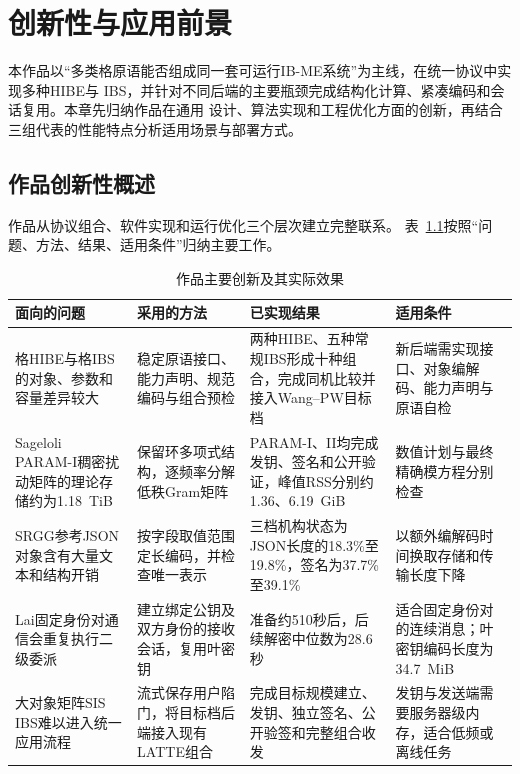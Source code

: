 \chapter{创新性与应用前景}

本作品以“多类格原语能否组成同一套可运行IB-ME系统”为主线，在统一协议中实现多种HIBE与
IBS，并针对不同后端的主要瓶颈完成结构化计算、紧凑编码和会话复用。本章先归纳作品在通用
设计、算法实现和工程优化方面的创新，再结合三组代表的性能特点分析适用场景与部署方式。

\section{作品创新性概述}

作品从协议组合、软件实现和运行优化三个层次建立完整联系。
表~\ref{tab:innovation-summary}按照“问题、方法、结果、适用条件”归纳主要工作。

\begin{table}[H]
\centering\small
\caption{作品主要创新及其实际效果}
\label{tab:innovation-summary}
\begin{tabularx}{\textwidth}{@{}>{\raggedright\arraybackslash}p{}>{\raggedright\arraybackslash}p{}>{\raggedright\arraybackslash}p{}>{\raggedright\arraybackslash}X@{}}
\toprule
\rowcolor{black!8} 面向的问题 & 采用的方法 & 已实现结果 & 适用条件 \\
\midrule
格HIBE与格IBS的对象、参数和容量差异较大
& 稳定原语接口、能力声明、规范编码与组合预检
& 两种HIBE、五种常规IBS形成十种组合，完成同机比较并接入Wang--PW目标档
& 新后端需实现接口、对象编解码、能力声明与原语自检 \\

Sageloli PARAM-I稠密扰动矩阵的理论存储约为1.18~TiB
& 保留环多项式结构，逐频率分解低秩Gram矩阵
& PARAM-I、II均完成发钥、签名和公开验证，峰值RSS分别约1.36、6.19~GiB
& 数值计划与最终精确模方程分别检查 \\

SRGG参考JSON对象含有大量文本和结构开销
& 按字段取值范围定长编码，并检查唯一表示
& 三档机构状态为JSON长度的18.3\%至19.8\%，签名为37.7\%至39.1\%
& 以额外编解码时间换取存储和传输长度下降 \\

Lai固定身份对通信会重复执行二级委派
& 建立绑定公钥及双方身份的接收会话，复用叶密钥
& 准备约510秒后，后续解密中位数为28.6秒
& 适合固定身份对的连续消息；叶密钥编码长度为34.7~MiB \\

大对象矩阵SIS IBS难以进入统一应用流程
& 流式保存用户陷门，将目标档后端接入现有LATTE组合
& 完成目标规模建立、发钥、独立签名、公开验签和完整组合收发
& 发钥与发送端需要服务器级内存，适合低频或离线任务 \\
\bottomrule
\end{tabularx}
\end{table}

